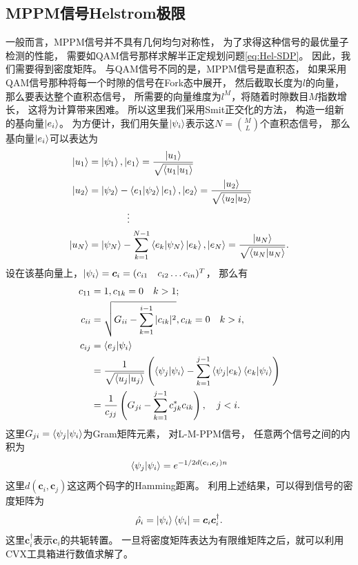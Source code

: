 \subsection{MPPM信号Helstrom极限}
一般而言，MPPM信号并不具有几何均匀对称性，
为了求得这种信号的最优量子检测的性能，
需要如QAM信号那样求解半正定规划问题\ref{eq:Hel-SDP}。
因此，我们需要得到密度矩阵。
与QAM信号不同的是，MPPM信号是直积态，
如果采用QAM信号那种将每一个时隙的信号在Fork态中展开，
然后截取长度为$l$的向量，那么要表达整个直积态信号，
所需要的向量维度为$l^M$，将随着时隙数目$M$指数增长，
这将为计算带来困难。
所以这里我们采用Smit正交化的方法\cite{lzw2010LA,zyh2007szjsff}，
构造一组新的基向量$\ket{e_i}$。
为方便计，我们用矢量$\ket{\psi_i}$表示这$N = \binom{M}{L}$个直积态信号，
那么基向量$\ket{e_i}$可以表达为
\begin{equation}
\begin{split}
\ket{u_1} &= \ket{\psi_1}, \ket{e_1} = \frac{\ket{u_1}}{\sqrt{\bra{u_1}\ket{u_1}}}\\
\ket{u_2} &= \ket{\psi_2} - \bra{e_1}\ket{\psi_2}\ket{e_1}, \ket{e_2} = \frac{\ket{u_2}}{\sqrt{\bra{u_2}\ket{u_2}}}\\
          &\qquad\qquad \vdots \\
\ket{u_N} &= \ket{\psi_N} - \sum_{k=1}^{N-1} \bra{e_k}\ket{\psi_N}\ket{e_k}, \ket{e_N} = \frac{\ket{u_N}}{\sqrt{\bra{u_N}\ket{u_N}}}.
\end{split}
\end{equation}
设在该基向量上，$\ket{\psi_i} =\bm{c}_i = (c_{i1} \quad c_{i2} \dots c_{in})^T$，
那么有
\begin{equation}
\begin{split}
c_{11} &= 1, c_{1k}=0 \quad k>1; \\
c_{ii} &= \sqrt{G_{ii} - \sum_{k=1}^{i-1} |c_{ik}|^2 }, c_{ik}=0 \quad k>i, \\
c_{ij} &= \bra{e_j}\ket{\psi_i} \\
       &= \frac{1}{\sqrt{\bra{u_j}\ket{u_j}}} \left( \bra{\psi_j}\ket{\psi_i} - \sum_{k=1}^{j-1} \bra{\psi_j}\ket{e_k} \bra{e_k}\ket{\psi_i} \right)\\
       &= \frac{1}{c_{jj}} \left( G_{ji} - \sum_{k=1}^{j-1} c_{jk}^* c_{ik} \right), \quad j<i.
\end{split}
\end{equation}
这里$G_{ji}=\bra{\psi_j}\ket{\psi_i}$为Gram矩阵元素，
对L-M-PPM信号，
任意两个信号之间的内积为
\begin{equation}
\bra{\psi_j}\ket{\psi_i}=e^{-1/2 d(\bm{c}_i, \bm{c}_j) n}
\end{equation}
这里$d(\bm{c}_i, \bm{c}_j)$这这两个码字的Hamming距离。
利用上述结果，可以得到信号的密度矩阵为
\begin{equation}
\hat{\rho_i} = \ket{\psi_i}\bra{\psi_i} = \bm{c}_i \bm{c}_i^\dagger.
\end{equation}
这里$\bm{c}_i^\dagger$表示$\bm{c}_i$的共轭转置。
一旦将密度矩阵表达为有限维矩阵之后，就可以利用CVX工具箱\cite{cvx,gb08}进行数值求解了。

